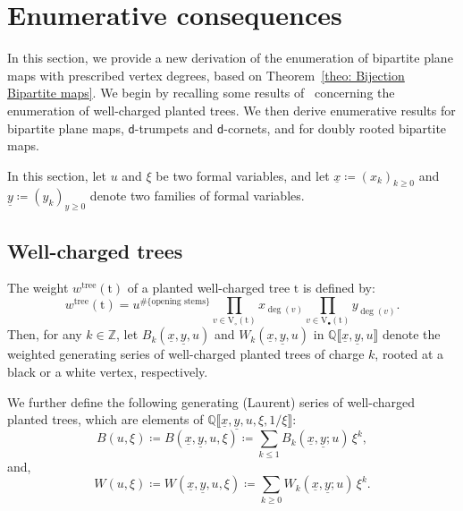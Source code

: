 \documentclass[11pt,reqno,tbtags]{amsart}
\providecommand{\Z}{}
\providecommand{\Q}{}
\renewcommand{\Z}{\mathbb{Z}}
\renewcommand{\Q}{\mathbb{Q}}
\newcommand{\rV}{\mathrm{V}}
\newcommand{\rt}{\mathrm{t}}
\newcommand{\ux}{\underline{x}}
\newcommand{\uy}{\underline{y}}
\numberwithin{equation}{section}
\numberwithin{theo}{section}
\theoremstyle{definition}
\newcommand{\dtrum}{$\mathsf{d}$-trumpet}
\newcommand{\dcorn}{$\mathsf{d}$-cornet}
\begin{document}
\section{Enumerative consequences}\label{sec4}


In this section, we provide a new derivation of the enumeration of bipartite plane maps with prescribed vertex degrees, based on Theorem~\ref{theo: Bijection Bipartite maps}. We begin by recalling some results of~\cite{BousquetMelouSchaeffer_Bipartite} concerning the enumeration of well-charged planted trees. We then derive enumerative results for bipartite plane maps, \dtrum s and \dcorn s, and for doubly rooted bipartite maps. 


In this section, let $u$ and $\xi$ be two formal variables, and let $\ux\coloneqq \left(x_k\right)_{k\geq 0}$ and $\uy\coloneqq \left(y_k\right)_{y\geq 0}$ denote two families of formal variables.

	\subsection{Well-charged trees}\label{sec: trees gf}
The weight $w^\mathrm{tree}(\rt)$ of a planted well-charged tree $\rt$ is defined by: 
\begin{equation}\label{eq:weight_well_charged_tree}
	w^\mathrm{tree}(\rt)=u^{\#\{\text{opening stems}\}}\prod_{ v\in \rV_\circ(\rt)}x_{\deg(v)}\prod_{v\in \rV_\bullet(\rt)}y_{\deg(v)}.
\end{equation}
Then, for any $k\in\Z$, let $B_k(\ux,\uy, u)$ and $W_k(\ux,\uy, u)$ in $\Q\llbracket\ux,\uy,u \rrbracket$ denote the weighted generating series of well-charged planted trees of charge $k$, rooted at a black or a white vertex, respectively.

We further define the following generating (Laurent) series of well-charged planted trees,  which are elements of $\Q\llbracket\ux,\uy,u, \xi, 1/\xi \rrbracket$:
\begin{equation}
B(u, \xi) \coloneqq  B(\ux,\uy, u, \xi) \coloneqq \sum_{k\leq 1}B_k(\ux,\uy; u) \,\xi^k,
\end{equation}
and,
\begin{equation}
 W(u, \xi) \coloneqq  W(\ux,\uy, u, \xi) \coloneqq \sum_{k\geq 0} W_k(\ux,\uy; u)\, \xi^k.
\end{equation}
\end{document}
